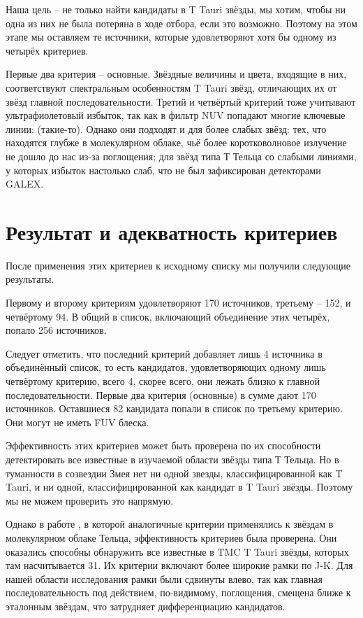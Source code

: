 Наша цель -- не только найти кандидаты в T Tauri звёзды, мы хотим, чтобы ни одна из них не была потеряна в ходе отбора, если это возможно. Поэтому на этом этапе мы оставляем те источники, которые удовлетворяют хотя бы одному из четырёх критериев.

Первые два критерия -- основные. Звёздные величины и цвета, входящие в них, соответствуют спектральным особенностям T Tauri звёзд, отличающих их от звёзд главной последовательности. Третий и четвёртый критерий тоже учитывают ультрафиолетовый избыток, так как в фильтр NUV попадают многие ключевые линии: (такие-то). Однако они подходят и для более слабых звёзд: тех, что находятся глубже в молекулярном облаке, чьё более коротковолновое излучение не дошло до нас из-за поглощения; для звёзд типа Т Тельца со слабыми линиями, у которых избыток настолько слаб, что не был зафиксирован детекторами GALEX.

\section{Результат и адекватность критериев}
После применения этих критериев к исходному списку мы получили следующие результаты.

Первому и второму критериям удовлетворяют 170 источников, третьему -- 152, и четвёртому 94. В общий в список, включающий объединение этих четырёх, попало 256 источников.


Следует отметить, что последний критерий добавляет лишь 4 источника в объединённый список, то есть кандидатов, удовлетворяющих одному лишь четвёртому критерию, всего 4, скорее всего, они лежать близко к главной последовательности. Первые два критерия (основные) в сумме дают 170 источников. Оставшиеся 82 кандидата попали в список по третьему критерию. Они могут не иметь FUV блеска.

Эффективность этих критериев может быть проверена по их способности детектировать все известные в изучаемой области звёзды типа Т Тельца. Но в туманности в созвездии Змея нет ни одной звезды, классифицированной как T Tauri, и ни одной, классифицированной как кандидат в T Tauri звёзды. Поэтому мы не можем проверить это напрямую.

Однако в работе \cite{AIGdC2014galex}, в которой аналогичные критерии применялись к звёздам в молекулярном облаке Тельца, эффективность критериев была проверена. Они оказались способны обнаружить все известные в TMC T Tauri звёзды, которых там насчитывается 31. Их критерии включают более широкие рамки по J-K. Для нашей области исследования рамки были сдвинуты влево, так как главная последовательность под действием, по-видимому, поглощения, смещена ближе к эталонным звёздам, что затрудняет дифференциацию кандидатов.
